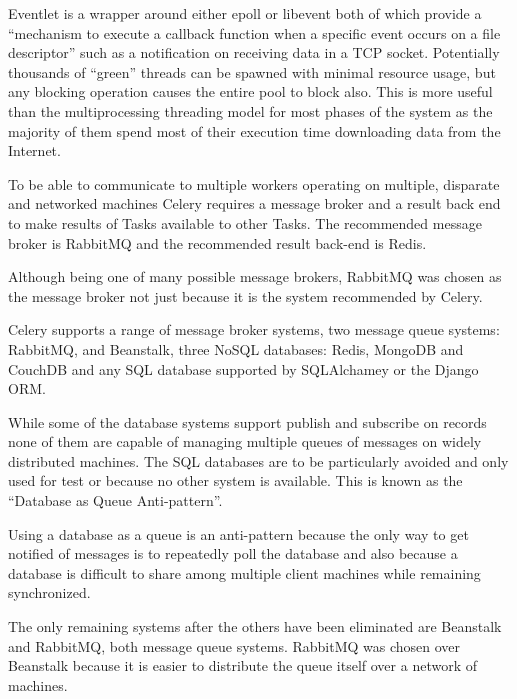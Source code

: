 Eventlet is a wrapper around either epoll or libevent both of which provide a ``mechanism to execute a callback function when a specific event occurs on a file descriptor'' such as a notification on receiving data in a TCP socket.  Potentially thousands of ``green'' threads can be spawned with minimal resource usage, but any blocking operation causes the entire pool to block also. This is more useful than the multiprocessing threading model for most phases of the system as the majority of them spend most of their execution time downloading data from the Internet.

To be able to communicate to multiple workers operating on multiple, disparate and networked machines Celery requires a message broker and a result back end to make results of Tasks available to other Tasks.  The recommended message broker is RabbitMQ and the recommended result back-end is Redis.

Although being one of many possible message brokers, RabbitMQ was chosen as the message broker not just because it is the system recommended by Celery.

Celery supports a range of message broker systems, two message queue systems: RabbitMQ, and Beanstalk, three NoSQL databases: Redis, MongoDB and CouchDB and any SQL database supported by SQLAlchamey or the Django ORM.

While some of the database systems support publish and subscribe on records none of them are capable of managing multiple queues of messages on widely distributed machines.  The SQL databases are to be particularly avoided and only used for test or because no other system is available. This is known as the ``Database as Queue Anti-pattern''\cite{database-as-mq}.

Using a database as a queue is an anti-pattern because the only way to get notified of messages is to repeatedly poll the database and also because a database is difficult to share among multiple client machines while remaining synchronized.

The only remaining systems after the others have been eliminated are Beanstalk and RabbitMQ, both message queue systems.  RabbitMQ was chosen over Beanstalk because it is easier to distribute the queue itself over a network of machines.





